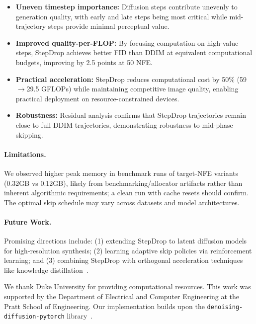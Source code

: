 \documentclass{article}
\begin{document}
\begin{itemize}
    \item \textbf{Uneven timestep importance:} Diffusion steps contribute unevenly to generation quality, with early and late steps being most critical while mid-trajectory steps provide minimal perceptual value.
    
    \item \textbf{Improved quality-per-FLOP:} By focusing computation on high-value steps, StepDrop achieves better FID than DDIM at equivalent computational budgets, improving by 2.5 points at 50 NFE.
    
    \item \textbf{Practical acceleration:} StepDrop reduces computational cost by 50\% (59$\rightarrow$29.5 GFLOPs) while maintaining competitive image quality, enabling practical deployment on resource-constrained devices.
    
    \item \textbf{Robustness:} Residual analysis confirms that StepDrop trajectories remain close to full DDIM trajectories, demonstrating robustness to mid-phase skipping.
\end{itemize}

\paragraph{Limitations.} We observed higher peak memory in benchmark runs of target-NFE variants (0.32GB vs 0.12GB), likely from benchmarking/allocator artifacts rather than inherent algorithmic requirements; a clean run with cache resets should confirm. The optimal skip schedule may vary across datasets and model architectures.

\paragraph{Future Work.} Promising directions include: (1) extending StepDrop to latent diffusion models for high-resolution synthesis; (2) learning adaptive skip policies via reinforcement learning; and (3) combining StepDrop with orthogonal acceleration techniques like knowledge distillation~\citep{zhang2024accelerating, zhu2024slimflow}.

\begin{ack}
We thank Duke University for providing computational resources. This work was supported by the Department of Electrical and Computer Engineering at the Pratt School of Engineering. Our implementation builds upon the \texttt{denoising-diffusion-pytorch} library~\citep{lucidrains2023diffusion}.
\end{ack}
\end{document}
